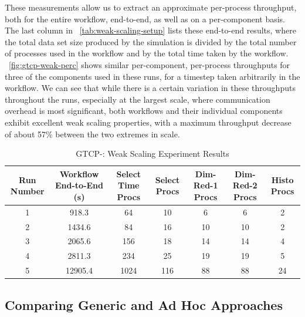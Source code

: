 These measurements allow us to extract an
approximate per-process throughput, both for
the entire workflow, end-to-end, as well as on
a per-component basis.
The last column in ~\autoref{tab:weak-scaling-setup}
lists these end-to-end results, where the total
data set size produced by the simulation is divided
by the total number of processes used in the workflow
and by the total time taken by the workflow.
~\autoref{fig:gtcp-weak-perc}
shows similar per-component, per-process throughputs for
three of the components used in these runs,
for a timestep taken arbitrarily in the workflow.
We can see that while there is a certain variation
in these throughputs throughout the runs, especially
at the largest scale, where communication overhead
is most significant, both \sys workflows and their
individual components exhibit excellent weak scaling properties,
with a maximum throughput decrease of about 57\% between 
the two extremes in scale.

\begin{table}[tbp]
  \centering
  \caption{GTCP-\sys: Weak Scaling Experiment Results}
  \label{tab:weak-scaling-setup}
  \vspace{-0.07in}
  \begin{tabular}{|c|c|c|c|c|c|c|}
    \hline
    Run Number & Workflow End-to-End (s) & Select Time Procs & Select Procs & Dim-Red-1 Procs & Dim-Red-2 Procs & Histo Procs\\
    \hline
    1 & 918.3 & 64 & 10 & 6 & 6 & 2\\
    \hline
    2 & 1434.6 & 84 & 16 & 10 & 10 & 2\\
    \hline
    3 & 2065.6 & 156 & 18 & 14 & 14 & 4\\
    \hline
    4 & 2811.3 & 234 & 25 & 19 & 19 & 5\\
    \hline
    5 & 12905.4 & 1024 & 116 & 88 & 88 & 24\\
    \hline
  \end{tabular}
  \vspace{-0.15in}
\end{table}
\fi

\subsection{Comparing Generic and Ad Hoc Approaches}

